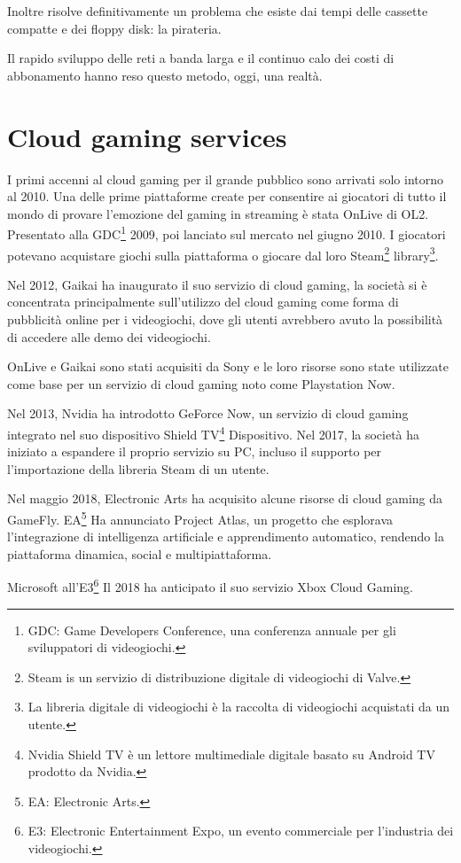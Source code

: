 Inoltre risolve definitivamente un problema che esiste dai tempi delle cassette compatte e dei floppy disk: la pirateria.

Il rapido sviluppo delle reti a banda larga e il continuo calo dei costi di abbonamento hanno reso questo metodo, oggi, una realtà.

\section{Cloud gaming services}
I primi accenni al cloud gaming per il grande pubblico sono arrivati solo intorno al 2010. Una delle prime piattaforme create per consentire ai giocatori di tutto il mondo di provare l'emozione del gaming in streaming è stata OnLive di OL2. Presentato alla GDC\footnote{GDC: Game Developers Conference, una conferenza annuale per gli sviluppatori di videogiochi.} 2009, poi lanciato sul mercato nel giugno 2010. I giocatori potevano acquistare giochi sulla piattaforma o giocare dal loro Steam\footnote{Steam is un servizio di distribuzione digitale di videogiochi di Valve.} library\footnote{La libreria digitale di videogiochi è la raccolta di videogiochi acquistati da un utente.}.

Nel 2012, Gaikai ha inaugurato il suo servizio di cloud gaming, la società si è concentrata principalmente sull'utilizzo del cloud gaming come forma di pubblicità online per i videogiochi, dove gli utenti avrebbero avuto la possibilità di accedere alle demo dei videogiochi.

OnLive e Gaikai sono stati acquisiti da Sony e le loro risorse sono state utilizzate come base per un servizio di cloud gaming noto come Playstation Now.

Nel 2013, Nvidia ha introdotto GeForce Now, un servizio di cloud gaming integrato nel suo dispositivo Shield TV\footnote{Nvidia Shield TV è un lettore multimediale digitale basato su Android TV prodotto da Nvidia.} Dispositivo. Nel 2017, la società ha iniziato a espandere il proprio servizio su PC, incluso il supporto per l'importazione della libreria Steam di un utente.

Nel maggio 2018, Electronic Arts ha acquisito alcune risorse di cloud gaming da GameFly. EA\footnote{EA: Electronic Arts.} Ha annunciato Project Atlas, un progetto che esplorava l'integrazione di intelligenza artificiale e apprendimento automatico, rendendo la piattaforma dinamica, social e multipiattaforma.

Microsoft all'E3\footnote{E3: Electronic Entertainment Expo, un evento commerciale per l'industria dei videogiochi.} Il 2018 ha anticipato il suo servizio Xbox Cloud Gaming.

